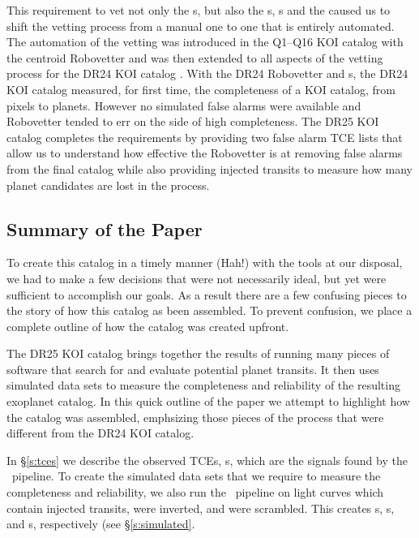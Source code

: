 This requirement to vet not only the \obstce s, but also the \injtce s, \scrtce s and the  caused us to shift the vetting process from a manual one to one that is entirely automated.  The automation of the vetting was introduced in the Q1--Q16 KOI catalog \citet{Mullally2015cat} with the centroid Robovetter and was then extended to all aspects of the vetting process for the DR24 KOI catalog \citep{Coughlin2016}. With the DR24 Robovetter and \injtce s, the DR24 KOI catalog measured, for first time, the completeness of a KOI catalog, from pixels to planets.  However no simulated false alarms were available and Robovetter tended to err on the side of high completeness.  The DR25 KOI catalog completes the requirements by providing two false alarm TCE lists that allow us to understand how effective the Robovetter is at removing false alarms from the final catalog while also providing injected transits to measure how many planet candidates are lost in the process.  

\subsection{Summary of the Paper}
To create this catalog in a timely manner (Hah!) with the tools at our disposal, we had to make a few decisions that were not necessarily ideal, but yet were sufficient to accomplish our goals.  As a result there are a few confusing pieces to the story of how this catalog as been assembled. To prevent confusion, we place a complete outline of how the catalog was created upfront.

The DR25 KOI catalog brings together the results of running many pieces of software that search for and evaluate potential planet transits. It then uses simulated data sets to measure the completeness and reliability of the resulting exoplanet catalog.  In this quick outline of the paper we attempt to highlight how the catalog was assembled, emphsizing those pieces of the process that were different from the DR24 KOI catalog.

In \S\ref{s:tces} we describe the observed TCEs, \opstce s, which are the signals found by the \Kepler\ pipeline. To create the simulated data sets that we require to measure the completeness and reliability, we also run the \Kepler\ pipeline on light curves which contain injected transits, were inverted, and were scrambled. This creates \injtce s, \invtce s, and \scrtce s, respectively (see \S\ref{s:simulated}.  

